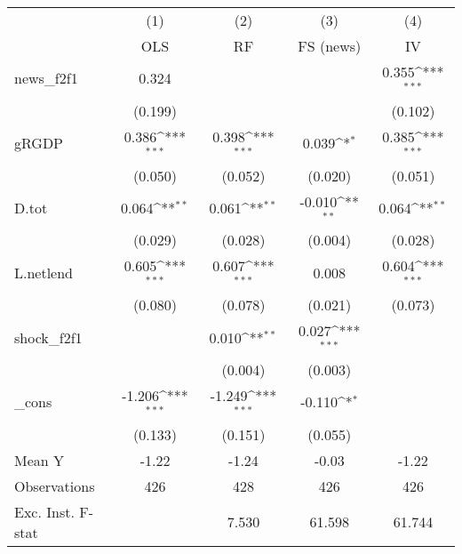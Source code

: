 {
\def\sym#1{\ifmmode^{#1}\else\(^{#1}\)\fi}
\begin{tabular}{l*{4}{c}}
\toprule
            &\multicolumn{1}{c}{(1)}&\multicolumn{1}{c}{(2)}&\multicolumn{1}{c}{(3)}&\multicolumn{1}{c}{(4)}\\
            &\multicolumn{1}{c}{OLS}&\multicolumn{1}{c}{RF}&\multicolumn{1}{c}{FS (news)}&\multicolumn{1}{c}{IV}\\
\midrule
news\_f2f1   &       0.324         &                     &                     &       0.355\sym{***}\\
            &     (0.199)         &                     &                     &     (0.102)         \\
\addlinespace
gRGDP       &       0.386\sym{***}&       0.398\sym{***}&       0.039\sym{*}  &       0.385\sym{***}\\
            &     (0.050)         &     (0.052)         &     (0.020)         &     (0.051)         \\
\addlinespace
D.tot       &       0.064\sym{**} &       0.061\sym{**} &      -0.010\sym{**} &       0.064\sym{**} \\
            &     (0.029)         &     (0.028)         &     (0.004)         &     (0.028)         \\
\addlinespace
L.netlend   &       0.605\sym{***}&       0.607\sym{***}&       0.008         &       0.604\sym{***}\\
            &     (0.080)         &     (0.078)         &     (0.021)         &     (0.073)         \\
\addlinespace
shock\_f2f1  &                     &       0.010\sym{**} &       0.027\sym{***}&                     \\
            &                     &     (0.004)         &     (0.003)         &                     \\
\addlinespace
\_cons      &      -1.206\sym{***}&      -1.249\sym{***}&      -0.110\sym{*}  &                     \\
            &     (0.133)         &     (0.151)         &     (0.055)         &                     \\
\midrule
Mean Y      &       -1.22         &       -1.24         &       -0.03         &       -1.22         \\
Observations&         426         &         428         &         426         &         426         \\
Exc. Inst. F-stat&                     &       7.530         &      61.598         &      61.744         \\
\bottomrule
\end{tabular}
}
